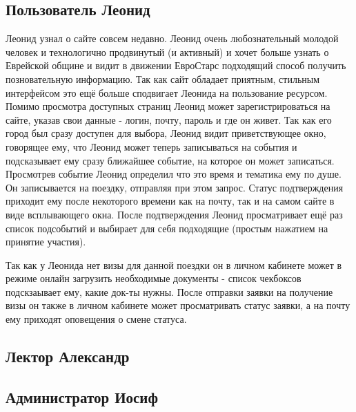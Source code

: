 \documentclass[DIV=calc, paper=a4, fontsize=11pt]{scrartcl} %
\begin{document}
\begin{framed}
\subsection{Пользователь Леонид}
Леонид узнал о сайте совсем недавно. Леонид очень любознательный молодой человек и технологично продвинутый (и активный) и хочет больше узнать о Еврейской общине и видит в движении ЕвроСтарс подходящий способ получить позновательную информацию. Так как сайт обладает приятным, стильным интерфейсом это ещё больше сподвигает Леонида на пользование ресурсом.
\\[0.5cm]
Помимо просмотра доступных страниц Леонид может зарегистрироваться на сайте, указав свои данные - логин, почту, пароль и где он живет. Так как его город был сразу доступен для выбора, Леонид видит приветствующее окно, говорящее ему, что Леонид может теперь записываться на события и подсказывает ему сразу ближайшее событие, на которое он может записаться.
\\[0.5cm]
Просмотрев событие Леонид определил что это время и тематика ему по душе. Он записывается на поездку, отправляя при этом запрос. Статус подтверждения приходит ему после некоторого времени как на почту, так и на самом сайте в виде всплывающего окна. После подтверждения Леонид просматривает ещё раз список подсобытий и выбирает для себя подходящие (простым нажатием на принятие участия).

Так как у Леонида нет визы для данной поездки он в личном кабинете может в режиме онлайн загрузить необходимые документы - список чекбоксов подскзаывает ему, какие док-ты нужны. После отправки заявки на получение визы он также в личном кабинете может просматривать статус заявки, а на почту ему приходят оповещения о смене статуса.
\end{framed}

\begin{framed}
\subsection{Лектор Александр}
\end{framed}

\begin{framed}
\subsection{Администратор Иосиф}
\end{framed}
\end{document}
